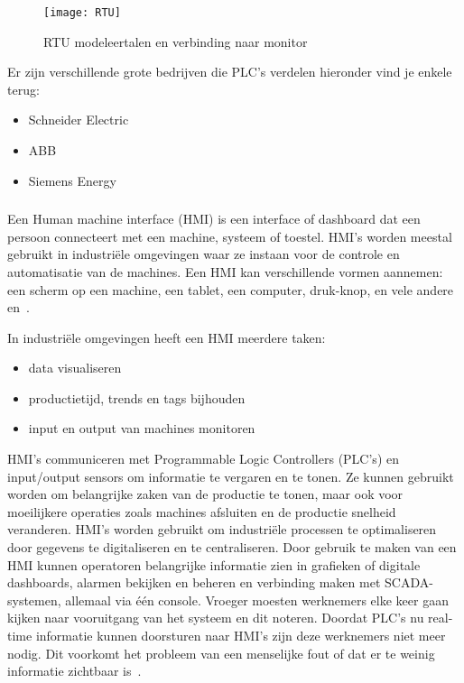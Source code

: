\begin{figure}
    \texttt{[image: RTU]}
    \caption{RTU modeleertalen en verbinding naar monitor~\autocite{Realpars2018} \label{fig:2.6}} 
\end{figure}

Er zijn verschillende grote bedrijven die PLC's verdelen hieronder vind je enkele terug:
\begin{itemize}
    \item Schneider Electric
    \item ABB
    \item Siemens Energy
\end{itemize}

\subsubsection{}
\label{subsubsec:HMI}
Een Human machine interface (HMI) is een interface of dashboard dat een persoon connecteert met een machine, systeem of toestel. HMI's worden meestal gebruikt in industriële omgevingen waar ze instaan voor de controle en automatisatie van de machines. Een HMI kan verschillende vormen aannemen: een scherm op een machine, een tablet, een computer, druk-knop, en vele andere~\autocite{Exor2019} en~\autocite{2018}.

In industriële omgevingen heeft een HMI meerdere taken:
\begin{itemize}
    \item data visualiseren
    \item productietijd, trends en tags bijhouden
    \item input en output van machines monitoren
\end{itemize}

HMI's communiceren met Programmable Logic Controllers (PLC's) en input/output sensors om informatie te vergaren en te tonen. Ze kunnen gebruikt worden om belangrijke zaken van de productie te tonen, maar ook voor moeilijkere operaties zoals machines afsluiten en de productie snelheid veranderen. HMI's worden gebruikt om industriële processen te optimaliseren door gegevens te digitaliseren en te centraliseren. Door gebruik te maken van een HMI kunnen operatoren belangrijke informatie zien in grafieken of digitale dashboards, alarmen bekijken en beheren en verbinding maken met SCADA-systemen, allemaal via één console. Vroeger moesten werknemers elke keer gaan kijken naar vooruitgang van het systeem en dit noteren. Doordat PLC's nu real-time informatie kunnen doorsturen naar HMI's zijn deze werknemers niet meer nodig. Dit voorkomt het probleem van een menselijke fout of dat er te weinig informatie zichtbaar is~\autocite{2018}.


